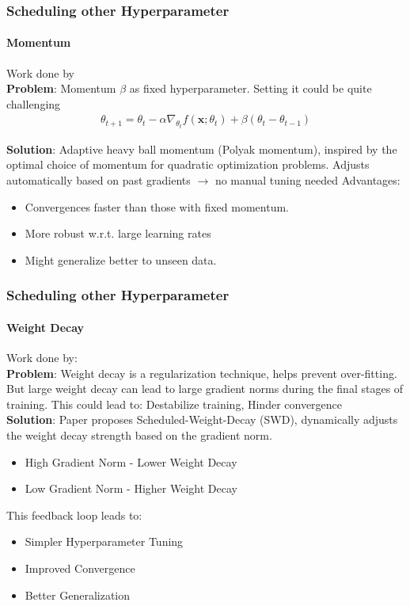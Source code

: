 \documentclass[10pt,aspectratio=169]{beamer}
\begin{document}
    \begin{frame}
        \frametitle{Scheduling other Hyperparameter}
        \framesubtitle{Momentum}
        Work done by \cite{sun2021training} \\
        \vspace{0.5cm}
        \textbf{Problem}: Momentum $\beta$ as fixed hyperparameter. Setting it could be quite challenging \\
        \begin{align*}
            \theta_{t +1 } = \theta_t - \alpha \nabla_{\theta_t} f(\boldsymbol{x}; \theta_t) + \beta (\theta_t - \theta_{t - 1})
        \end{align*}
        
        \textbf{Solution}: Adaptive heavy ball momentum (Polyak momentum), inspired by the optimal choice of momentum for quadratic optimization problems. Adjusts automatically based on past gradients $\to$ no manual tuning needed
        \vspace{0.5cm}
        Advantages:
        \begin{itemize}
            \item Convergences faster than those with fixed momentum.
            \item More robust w.r.t. large learning rates
            \item Might generalize better to unseen data.
        \end{itemize}
    \end{frame}

    \begin{frame}
        \frametitle{Scheduling other Hyperparameter}
        \framesubtitle{Weight Decay}
        Work done by: \cite{xie2024overlooked}\\
        \vspace{0.5cm}
        \textbf{Problem}: Weight decay is a regularization technique, helps prevent over-fitting. But large weight decay can lead to large gradient norms during the final stages of training. This could lead to:
        Destabilize training, Hinder convergence\\ 
        \textbf{Solution}: Paper proposes Scheduled-Weight-Decay (SWD), dynamically adjusts the weight decay strength based on the gradient norm.
        \begin{itemize}
            \item High Gradient Norm - Lower Weight Decay
            \item Low Gradient Norm - Higher Weight Decay
        \end{itemize}
        This feedback loop leads to:
        \begin{itemize}
            \item Simpler Hyperparameter Tuning
            \item Improved Convergence
            \item Better Generalization
        \end{itemize}
    \end{frame}
\end{document}
